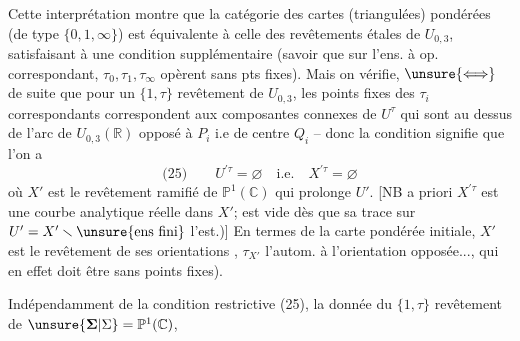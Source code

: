 Cette interprétation montre que la catégorie  des cartes (triangulées) pondérées (de type $\{0,1,\infty\}$) est équivalente à  celle des revêtements  étales de $U_{0,3}$,  satisfaisant à une condition supplémentaire (savoir que sur l'ens. à op. correspondant, $\tau_0,\tau_1,\tau_\infty$ opèrent sans pts fixes). Mais on vérifie, $\unsure{\Longleftrightarrow}$ de suite que  pour un $\{1,\tau\}$ revêtement de $U_{0,3}$, les points fixes des $\tau_i$ correspondants correspondent aux composantes connexes de $U^\tau$ qui sont au dessus de l'arc de $U_{0,3}(\mathbb R)$ opposé à $P_i$ i.e  de centre $Q_i$ -- donc la condition signifie que  l'on a
\[
\text{(25)}\qquad U^{\prime\tau}=\varnothing\quad\text{i.e.}\quad X^{\prime\tau}=\varnothing
\]
où $X'$ est le revêtement ramifié de $\mathbb P^1(\mathbb C)$ qui prolonge $U'$. [NB  a priori $X^{\prime\tau}$ est une courbe analytique réelle  dans $X'$;  est  vide dès que sa trace sur $U'=X'\smallsetminus\unsure{\text{ens fini}}$  l'est.)]  En termes de la carte pondérée initiale, $X'$ est le revêtement de ses orientations , $\tau_{X'}$  l'autom.   à l'orientation opposée..., qui en effet doit être sans points fixes).

Indépendamment de la condition restrictive (25), la donnée du $\{1,\tau\}$ revêtement  de $\unsure{\boldsymbol{\Sigma}|\Sigma}=\mathbb P^1(\mathbb C)$,
